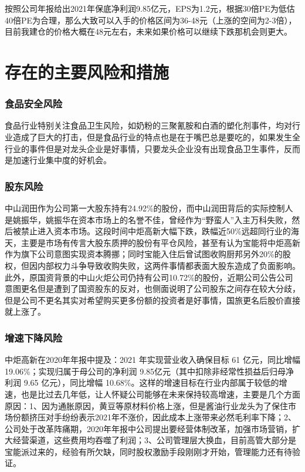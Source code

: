 \documentclass[UTF8,a4paper,zihao=-4,fontset = windows]{ctexart} %
\begin{document}
按照公司年报给出2021年保底净利润9.85亿元，EPS为1.2元，根据30倍PE为低估40倍PE为合理，那么大致可以入手的价格区间为36-48元（上涨的空间为2-3倍），目前我建仓的价格大概在48元左右，未来如果价格可以继续下跌那机会则更大。

\part{存在的主要风险和措施}
\section{食品安全风险}
食品行业特别关注食品卫生风险，如奶粉的三聚氰胺和白酒的塑化剂事件，均对行业造成了巨大的打击，但是食品行业的特点也是在于嘴巴总是要吃的，如果发生全行业的事件但是对龙头企业是好事情，只要龙头企业没有出现食品卫生事件，反而是加速行业集中度的好机会。

\section{股东风险}
中山润田作为公司第一大股东持有24.92\%的股份，而中山润田背后的实际控制人是姚振华，姚振华在资本市场上的名誉不佳，曾经作为“野蛮人”入主万科失败，然后被禁止进入资本市场。这段时间中炬高新大幅下跌，跌幅近50\%远超同行业的海天，主要是市场有传言大股东质押的股份有平仓风险，甚至有认为宝能将中炬高新作为旗下公司意图实现资本腾挪；同时宝能入住后曾试图收购厨邦另外20\%的股权，但因内部权力斗争导致收购失败，这两件事情都表面大股东造成了负面影响。此外，原国资背景的中山火炬公司仍持有公司10.72\%的股份，近期公司公告公司意图更名但是遭到了国资股东的反对，也侧面说明了公司股东之间存在较大分歧，但是公司不更名其实对希望购买更多份额的投资者是好事情，国旅更名后股价直接就上涨了。

\section{增速下降风险}
中炬高新在2020年年报中提及：2021 年实现营业收入确保目标 61 亿元，同比增幅 19.06\%；实现归属于母公司的净利润 9.85亿元（其中扣除非经常性损益后归母净利润 9.65 亿元），同比增幅 10.68\%。这样的增速目标在行业内部属于较低的增速，也是比过去几年低，让人怀疑公司能够在未来保持较高增速，主要是几个方面原因：1、因为通胀原因，黄豆等原材料价格上涨，但是酱油行业龙头为了保住市场份额挤压对手纷纷表示2021年不涨价，因此成本上涨带来必然毛利率下降；2、公司处于改革阵痛期，2020年年报中公司提出要经营体制改革，加强市场营销，扩大经营渠道，这些费用均吞噬了利润；3、公司管理层大换血，目前高管大部分是宝能派过来的，经验有所欠缺，同时股权激励手段刚刚才开始，管理能力还有待验证。
\end{document}
